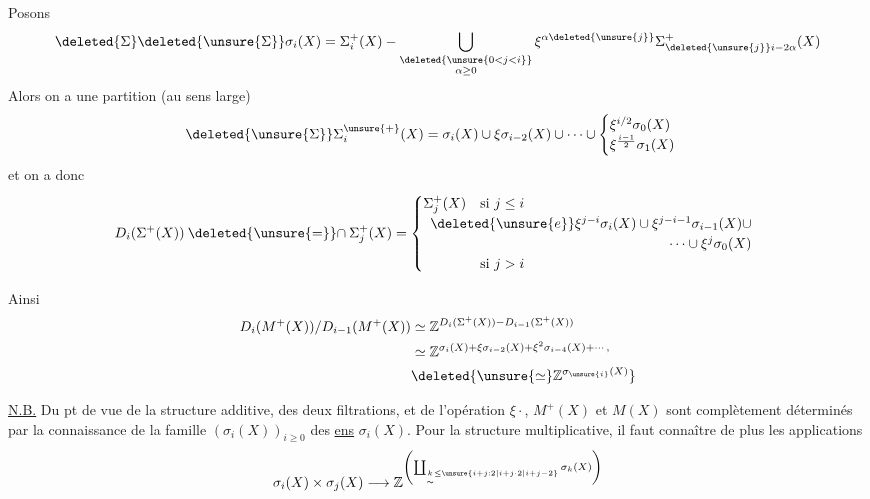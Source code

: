 Posons
\[
\deleted{\Sigma}\deleted{\unsure{\Sigma}}\sigma_i(X)=\Sigma_i^+(X)-\bigcup_{\substack{\deleted{\unsure{0<j<i}}\\\alpha\geq0}}\xi^{\alpha\deleted{\unsure{j}}}\Sigma^+_{\deleted{\unsure{j}}i-2\alpha}(X)
\]
Alors on a une partition (au sens large)
\[
\deleted{\unsure{\Sigma}}\Sigma^{\unsure{+}}_i(X)=\sigma_i(X)\cup\xi\sigma_{i-2}(X)\cup\dotsb\cup
\begin{cases}\xi^{i/2}\sigma_0(X)\\ \xi^{\frac{i-1}{2}}\sigma_1(X)\end{cases}
\]
et on a donc
\[
D_i(\Sigma^+(X))\mathbin{\deleted{\unsure{=}}\cap}\Sigma_j^+(X)=
\begin{cases}
\Sigma_j^+(X)&\text{si }j\leq i\\
\multicolumn{2}{l}{\deleted{\unsure{e}}\xi^{j-i}\sigma_i(X)\cup\xi^{j-i-1}\sigma_{i-1}(X)\cup}\\
\multicolumn{2}{r}{\dotsb\cup\xi^j\sigma_0(X)}\\
&\text{si }j>i
\end{cases}
\]

Ainsi
\[
\begin{aligned}
D_i(M^+(X))/D_{i-1}(M^+(X))&\simeq\mathbb Z^{D_i(\Sigma^+(X))-D_{i-1}(\Sigma^+(X))}\\
&\simeq\mathbb Z^{\sigma_i(X)+\xi\sigma_{i-2}(X)+\xi^{2}\sigma_{i-4}(X)+\dotsb,}\\
&\deleted{\unsure{\simeq}\mathbb Z^{\sigma_{\unsure{i}}(X)}}
\end{aligned}
\]

\uline{N.B.} Du pt de vue de la structure additive, des deux filtrations, et de l'opération $\xi\cdot$, $M^+(X)$ et $M(X)$ sont complètement déterminés par la connaissance de la famille $(\sigma_i(X))_{i\geq0}$ des \uline{ens} $\sigma_i(X)$.
Pour la structure multiplicative, il faut connaître de plus les applications
\[
\sigma_i(X)\times\sigma_j(X)\longrightarrow
\mathbb Z^{\left(\coprod_{\underset{\sim}{k}\leq\unsure{i+j:2|i+j\cdot2|i+j-2}}\sigma_k(X)\right)}
\]
